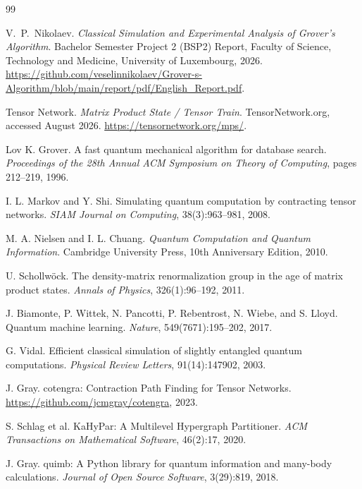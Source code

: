 \documentclass[sigconf, authorversion, nonacm]{acmart}
\begin{document}
\begin{thebibliography}{99}

 V.~P.~Nikolaev. \textit{Classical Simulation and Experimental Analysis of Grover's Algorithm}. Bachelor Semester Project 2 (BSP2) Report, Faculty of Science, Technology and Medicine, University of Luxembourg, 2026. \url{https://github.com/veselinnikolaev/Grover-s-Algorithm/blob/main/report/pdf/English_Report.pdf}.

 Tensor Network. \textit{Matrix Product State / Tensor Train}. TensorNetwork.org, accessed August 2026. \url{https://tensornetwork.org/mps/}.

 Lov K. Grover. A fast quantum mechanical algorithm for database search. \textit{Proceedings of the 28th Annual ACM Symposium on Theory of Computing}, pages 212--219, 1996.

 I. L. Markov and Y. Shi. Simulating quantum computation by contracting tensor networks. \textit{SIAM Journal on Computing}, 38(3):963--981, 2008.

 M. A. Nielsen and I. L. Chuang. \textit{Quantum Computation and Quantum Information}. Cambridge University Press, 10th Anniversary Edition, 2010.

 U. Schollw\"{o}ck. The density-matrix renormalization group in the age of matrix product states. \textit{Annals of Physics}, 326(1):96--192, 2011.

 J. Biamonte, P. Wittek, N. Pancotti, P. Rebentrost, N. Wiebe, and S. Lloyd. Quantum machine learning. \textit{Nature}, 549(7671):195--202, 2017.

 G. Vidal. Efficient classical simulation of slightly entangled quantum computations. \textit{Physical Review Letters}, 91(14):147902, 2003.

 J. Gray. cotengra: Contraction Path Finding for Tensor Networks. \url{https://github.com/jcmgray/cotengra}, 2023.

 S. Schlag et al. KaHyPar: A Multilevel Hypergraph Partitioner. \textit{ACM Transactions on Mathematical Software}, 46(2):17, 2020.

 J. Gray. quimb: A Python library for quantum information and many-body calculations. \textit{Journal of Open Source Software}, 3(29):819, 2018.

\end{thebibliography}
\end{document}
